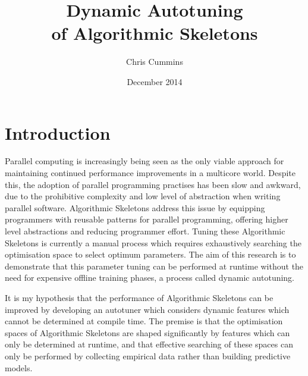 
\author{Chris Cummins}

\date{December 2014}

\title{Dynamic Autotuning\\of Algorithmic Skeletons}

\newcommand{\subtitle}{MSc Research Proposal}

\newcommand{\degreeTitle}{MSc by Research\\ Pervasive Parallelism}

\newcommand{\institution}{School of Informatics,\\
  The University of Edinburgh}



\section{Introduction}

Parallel computing is increasingly being seen as the only viable
approach for maintaining continued performance improvements in a
multicore world. Despite this, the adoption of parallel programming
practises has been slow and awkward, due to the prohibitive complexity
and low level of abstraction when writing parallel
software. Algorithmic Skeletons address this issue by equipping
programmers with reusable patterns for parallel programming, offering
higher level abstractions and reducing programmer effort. Tuning these
Algorithmic Skeletons is currently a manual process which requires
exhaustively searching the optimisation space to select optimum
parameters. The aim of this research is to demonstrate that this
parameter tuning can be performed at runtime without the need for
expensive offline training phases, a process called dynamic
autotuning.

It is my hypothesis that the performance of Algorithmic Skeletons can
be improved by developing an autotuner which considers dynamic
features which cannot be determined at compile time. The premise is
that the optimisation spaces of Algorithmic Skeletons are shaped
significantly by features which can only be determined at runtime, and
that effective searching of these spaces can only be performed by
collecting empirical data rather than building predictive models.

